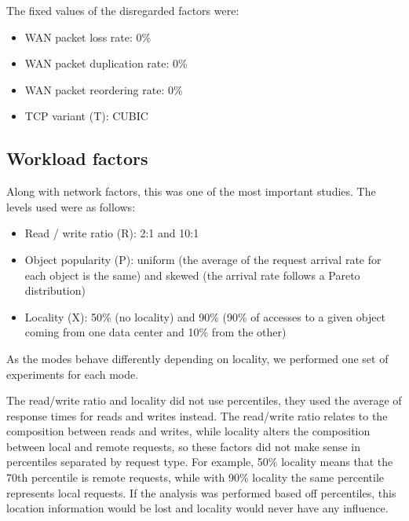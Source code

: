 \documentclass[doublespacing]{bmcart}
\begin{document}
The fixed values of the disregarded factors were:

\begin{itemize}

\item WAN packet loss rate: 0\%

\item WAN packet duplication rate: 0\%

\item WAN packet reordering rate: 0\%

\item TCP variant (T): CUBIC

\end{itemize}

\subsection{Workload factors}

Along with network factors, this was one of the most important studies. The
levels used were as follows:

\begin{itemize}

\item Read / write ratio (R): 2:1 and 10:1

\item Object popularity (P): uniform (the average of the request arrival rate
for each object is the same) and skewed (the arrival rate follows a Pareto
distribution)

\item Locality (X): 50\% (no locality) and 90\% (90\% of accesses to a given
object coming from one data center and 10\% from the other)

\end{itemize}

As the modes behave differently depending on locality, we performed one set of
experiments for each mode.

The read/write ratio and locality did not use percentiles, they used the
average of response times for reads and writes instead. The read/write ratio
relates to the composition between reads and writes, while locality alters
the composition between local and remote requests, so these factors did not
make sense in percentiles separated by request type. For example, 50\% locality
means that the 70th percentile is remote requests, while with 90\% locality the
same percentile represents local requests. If the analysis was performed based
off percentiles, this location information would be lost and locality would
never have any influence.
\end{document}
